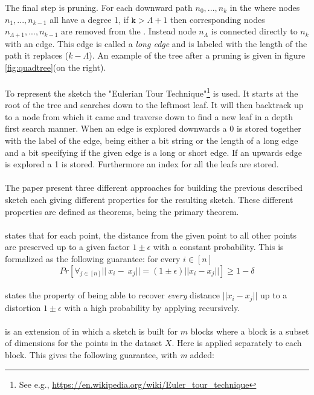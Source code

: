 The final step is pruning. For each downward path $n_0,...,n_k$ in the \qt{} where nodes $n_1,...,n_{k-1}$ all have a degree 1, if \ensuremath{\texttt{k} > \Lambda+1} then corresponding nodes $n_{\Lambda+1},...,n_{k-1}$ are removed from the \qt{}. Instead node $n_{\Lambda}$ is connected directly to $n_{k}$ with an edge. This edge is called a \textit{long edge} and is labeled with the length of the path it replaces ($k-\Lambda$). An example of the tree after a pruning is given in figure \ref{fig:quadtree}(on the right).
\\
\\
To represent the sketch the "Eulerian Tour Technique"\footnote{See e.g., \url{https://en.wikipedia.org/wiki/Euler\_tour\_technique}} is used.
It starts at the root of the tree and searches down to the leftmost leaf. It will then backtrack up to a node from which it came and traverse down to find a new leaf in a depth first search manner. When an edge is explored downwards a 0 is stored together with the label of the edge, being either a bit string or the length of a long edge and a bit specifying if the given edge is a long or short edge. If an upwards edge is explored a 1 is stored. Furthermore an index for all the leafs are stored.
\\
\\
The paper \cite{wagner17} present three different approaches for building the previous described sketch each giving different properties for the resulting sketch. These different properties are defined as theorems,  being the primary theorem.

\paragraph{} states that for each point, the distance from the given point to all other points are preserved up to a given factor $1\pm\epsilon$ with a constant probability. This is formalized as the following guarantee: for every $i\in{[n]}$
\begin{equation}
Pr[\forall{}_{j\in{}[n]} ||~x_i-~x_j||= (1\pm\epsilon)||x_i-x_j||] \geq 1 - \delta
\end{equation}
\paragraph{} states the property of being able to recover \textit{every} distance $||x_i-x_j||$  up to a distortion $1\pm\epsilon$ with a high probability by applying \qs{} recursively.
\paragraph{} is an extension of  in which a sketch is built for $m$ blocks where a block is a subset of dimensions for the points in the dataset $X$. Here \qs{} is applied separately to each block. This gives the following guarantee, with \textit{m} added:

